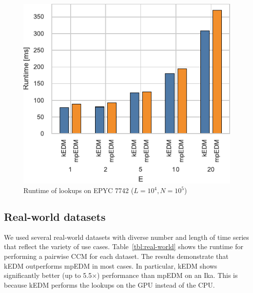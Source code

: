 \documentclass[sigconf]{acmart}
\begin{document}
\begin{figure}
    \centering
    \includegraphics{figs/runtime_lookup_epyc}
    \caption{Runtime of lookups on EPYC 7742 ($L=10^4, N=10^5$)}%
    \label{fig:breakdown-lookup-epyc}
\end{figure}

\subsection{Real-world datasets}

We used several real-world datasets with diverse number and length of time
series that reflect the variety of use cases.
Table~\ref{tbl:real-world} shows the runtime for performing a pairwise CCM for
each dataset. The results demonstrate that kEDM outperforms mpEDM in most
cases. In particular, kEDM shows significantly better (up to 5.5$\times$)
performance than mpEDM on an Ika\@. This is because kEDM performs the lookups
on the GPU instead of the CPU\@.
\end{document}
